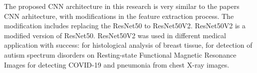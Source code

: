 The proposed CNN architecture in this research is very similar to the
papers CNN arhitecture, with modifications in the feature extraction process. The modification includes replacing the ResNet50 to ResNet50V2. ResNet50V2 is a modified version of ResNet50. ResNet50V2 was used in different medical application with success: 
for histological analysis of breast tissue,
for detection of autism spectrum disorders on Resting-state Functional Magnetic Resonance Images 
for detecting COVID-19 and pneumonia from chest X-ray images.
 






